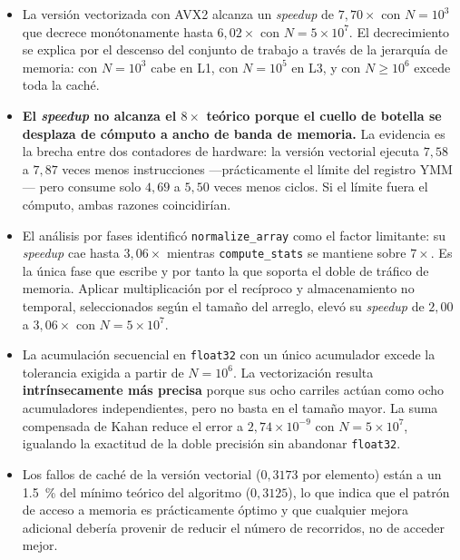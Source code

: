\documentclass[journal]{IEEEtran}
\begin{document}
\begin{itemize}
  \item La versión vectorizada con AVX2 alcanza un \textit{speedup} de
        $7,70\times$ con $N = 10^3$ que decrece monótonamente hasta
        $6,02\times$ con $N = 5\times10^7$. El decrecimiento se explica
        por el descenso del conjunto de trabajo a través de la jerarquía
        de memoria: con $N = 10^3$ cabe en L1, con $N = 10^5$ en L3, y con
        $N \ge 10^6$ excede toda la caché.

  \item \textbf{El \textit{speedup} no alcanza el $8\times$ teórico
        porque el cuello de botella se desplaza de cómputo a ancho de
        banda de memoria.} La evidencia es la brecha entre dos contadores
        de hardware: la versión vectorial ejecuta $7,58$ a $7,87$
        veces menos instrucciones ---prácticamente el límite del
        registro YMM--- pero consume solo $4,69$ a $5,50$ veces menos
        ciclos. Si el límite fuera el cómputo, ambas razones
        coincidirían.

  \item El análisis por fases identificó \texttt{normalize\_array} como
        el factor limitante: su \textit{speedup} cae hasta $3,06\times$
        mientras \texttt{compute\_stats} se mantiene sobre $7\times$. Es la
        única fase que escribe y por tanto la que soporta el doble de
        tráfico de memoria. Aplicar multiplicación por el recíproco y
        almacenamiento no temporal, seleccionados según el tamaño del
        arreglo, elevó su \textit{speedup} de $2,00$ a $3,06\times$
        con $N = 5\times10^7$.

  \item La acumulación secuencial en \texttt{float32} con un único
        acumulador excede la tolerancia exigida a partir de $N = 10^6$. La
        vectorización resulta \textbf{intrínsecamente más precisa}
        porque sus ocho carriles actúan como ocho acumuladores
        independientes, pero no basta en el tamaño mayor. La suma
        compensada de Kahan reduce el error a $2,74\times10^{-9}$ con
        $N = 5\times10^7$, igualando la exactitud de la doble precisión
        sin abandonar \texttt{float32}.

  \item Los fallos de caché de la versión vectorial ($0,3173$ por
        elemento) están a un \SI{1,5}{\percent} del mínimo teórico del
        algoritmo ($0,3125$), lo que indica que el patrón de acceso a
        memoria es prácticamente óptimo y que cualquier mejora adicional
        debería provenir de reducir el número de recorridos, no de
        acceder mejor.
\end{itemize}
\end{document}
